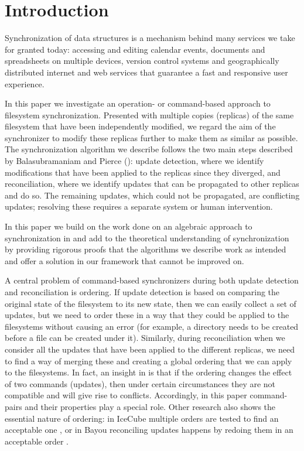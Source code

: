 
\section{Introduction}

Synchronization of data structures
is a mechanism behind many services we take for granted today:
accessing and editing calendar events, documents and spreadsheets
on multiple devices, version control systems and
geographically distributed internet and web services that
guarantee a fast and responsive user experience.

In this paper we investigate an operation- or command-based approach
to filesystem synchronization.
Presented with multiple copies (replicas) of the same filesystem that have been independently modified,
we regard the aim of the synchronizer to modify these replicas further
to make them as similar as possible.
The synchronization algorithm we describe
follows the two main steps described by Balasubramaniam and Pierce (\cite{BP}):
update detection, where we identify modifications that have been applied to the replicas
since they diverged,
and reconciliation, where we identify updates that can be propagated to other replicas and do so.
The remaining updates, which could not be propagated, are conflicting updates;
resolving these requires a separate system or human intervention.

In this paper we build on the work done 
on an algebraic approach to synchronization
in \cite{NREC} and add to the theoretical understanding
of synchronization by providing rigorous proofs that the algorithms
we describe work as intended
and offer a solution in our framework that cannot be improved on.

A central problem of command-based synchronizers 
during both update detection and reconciliation
is ordering.
If update detection is based on comparing the original state of the filesystem
to its new state, then we can easily collect a set of updates,
but we need to order these in a way that they could be applied
to the filesystems without causing an error 
(for example, a directory needs to be created before a file can be created under it).
Similarly, during reconciliation when we consider all the updates that
have been applied to the different replicas, we need to find a way of
merging these and creating a global ordering that we can apply
to the filesystems.
In fact, an insight in \cite{NREC} is that
if the ordering changes the effect of two commands (updates),
then under certain circumstances they are not compatible and will give rise to conflicts.
Accordingly, in this paper command-pairs and their properties
play a special role.
Other research also shows the essential nature of ordering:
in IceCube multiple orders are tested to find an acceptable one \cite{KRSD},
or in Bayou reconciling updates happens by redoing them in an acceptable order \cite{TTPDSH}.

